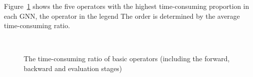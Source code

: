 Figure~\ref{fig:exp_top_basic_ops} shows the five operators with the highest time-consuming proportion in each GNN,
the operator in the legend The order is determined by the average time-consuming ratio.

\begin{figure}
    \centering
    \\
    \caption{The time-consuming ratio of basic operators (including the forward, backward and evaluation stages)}
    \label{fig:exp_top_basic_ops}
\end{figure}

